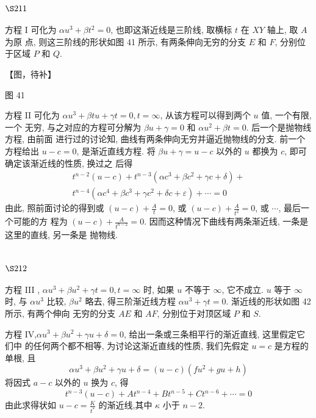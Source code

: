 \section{$\S 211$}

方程 $\mathrm{I}$ 可化为 $\alpha u^{3}+\beta t^{2}=0$, 也即这渐近线是三阶线, 取横标 $t$ 在 $X Y$ 轴上, 取 $A$ 为原 点, 则这三阶线的形状如图 41 所示, 有两条伸向无穷的分支 $E$ 和 $F$, 分别位于区域 $P$ 和 $Q$.


【图，待补】

图 41

方程 II 可化为 $\alpha u^{3}+\beta t u+\gamma t=0, t=\infty$, 从该方程可以得到两个 $u$ 值, 一个有限, 一个 无穷, 与之对应的方程可分解为 $\beta u+\gamma=0$ 和 $\alpha u^{2}+\beta t=0$. 后一个是抛物线方程, 由前面 进行过的讨论知, 曲线有两条伸向无穷并逼近抛物线的分支. 前一个方程给出 $u-c=0$, 是渐近直线方程. 将 $\beta u+\gamma=u-c$ 以外的 $u$ 都换为 $c$, 即可确定该渐近线的性质, 换过之 后得
\[
\begin{gathered}
t^{n-2}(u-c)+t^{n-3}\left(\alpha c^{3}+\beta c^{2}+\gamma c+\delta\right)+ \\
t^{n-4}\left(\alpha c^{4}+\beta c^{3}+\gamma c^{2}+\delta c+\varepsilon\right)+\cdots=0
\end{gathered}
\]
由此, 照前面讨论的得到或 $(u-c)+\frac{A}{t}=0$, 或 $(u-c)+\frac{A}{t^{2}}=0$, 或 $\cdots$, 最后一个可能的方 程为 $(u-c)+\frac{A}{t^{n-2}}=0$. 因而这种情况下曲线有两条渐近线, 一条是这里的直线, 另一条是 抛物线.

\section{$\S 212$}

方程 III , $\alpha u^{3}+\beta u^{2}+\gamma t=0, t=\infty$ 时, 如果 $u$ 不等于 $\infty$, 它不成立. $u$ 等于 $\infty$ 时, 与 $\alpha u^{3}$ 比较, $\beta u^{2}$ 略去, 得三阶渐近线方程 $\alpha u^{3}+\gamma t=0$. 渐近线的形状如图 42 所示, 有两个伸向 无穷的分支 $A E$ 和 $A F$, 分别位于对顶区域 $P$ 和 $S$.

方程 IV,$\alpha u^{3}+\beta u^{2}+\gamma u+\delta=0$, 给出一条或三条相平行的渐近直线, 这里假定它们中 的任何两个都不相等, 为讨论这渐近直线的性质, 我们先假定 $u=c$ 是方程的单根, 且
\[
\alpha u^{3}+\beta u^{2}+\gamma u+\delta=(u-c)\left(f u^{2}+g u+h\right)
\]
将因式 $a-c$ 以外的 $u$ 换为 $c$, 得
\[
t^{n-3}(u-c)+A t^{n-4}+B t^{n-5}+C t^{n-6}+\cdots=0
\]
由此求得状如 $u-c=\frac{K}{t^{*}}$ 的渐近线,其中 $\kappa$ 小于 $n-2$.


